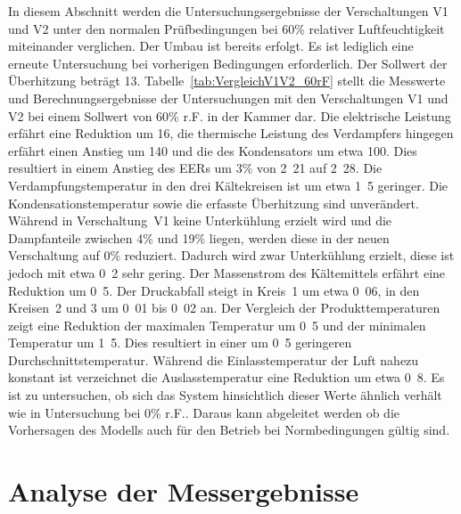 In diesem Abschnitt werden die Untersuchungsergebnisse der Verschaltungen V1 und V2 unter den normalen Prüfbedingungen bei \unit{60}{\%} relativer Luftfeuchtigkeit miteinander verglichen. Der Umbau ist bereits erfolgt. Es ist lediglich eine erneute Untersuchung bei vorherigen Bedingungen erforderlich. Der Sollwert der Überhitzung beträgt \unit{13}{\kelvin}. \newline
Tabelle~\ref{tab:VergleichV1V2_60rF} stellt die Messwerte und Berechnungsergebnisse der Untersuchungen mit den Verschaltungen V1 und V2 bei einem Sollwert von \unit{60}{\%} r.F. in der Kammer dar. Die elektrische Leistung erfährt eine Reduktion um \unit{16}{\watt}, die thermische Leistung des Verdampfers hingegen erfährt einen Anstieg um \unit{140}{\watt} und die des Kondensators um etwa \unit{100}{\watt}. Dies resultiert in einem Anstieg des EERs um \unit{3}{\%} von \unit{2.21}{} auf \unit{2.28}{}.
Die Verdampfungstemperatur in den drei Kältekreisen ist um etwa \unit{1.5}{\kelvin} geringer. Die Kondensationstemperatur sowie die erfasste Überhitzung sind unverändert.
Während in Verschaltung~V1 keine Unterkühlung erzielt wird und die Dampfanteile zwischen \unit{4}{\%} und \unit{19}{\%} liegen, werden diese in der neuen Verschaltung auf \unit{0}{\%} reduziert. Dadurch wird zwar Unterkühlung erzielt, diese ist jedoch mit etwa \unit{0.2}{\kelvin} sehr gering. Der Massenstrom des Kältemittels erfährt eine Reduktion um \unit{0.5}{\gram\per\second}. Der Druckabfall steigt in Kreis~1 um etwa \unit{0.06}{\bbar}, in den Kreisen~2 und 3 um \unit{0.01}{\bbar} bis \unit{0.02}{\bbar} an. Der Vergleich der Produkttemperaturen zeigt eine Reduktion der maximalen Temperatur um \unit{0.5}{\kelvin} und der minimalen Temperatur um \unit{1.5}{\kelvin}. Dies resultiert in einer um \unit{0.5}{\kelvin} geringeren Durchschnittstemperatur.
Während die Einlasstemperatur der Luft nahezu konstant ist verzeichnet die Auslasstemperatur eine Reduktion um etwa \unit{0.8}{\kelvin}.
Es ist zu untersuchen, ob sich das System hinsichtlich dieser Werte ähnlich verhält wie in Untersuchung bei \unit{0}{\%} r.F.. Daraus kann abgeleitet werden ob die Vorhersagen des Modells auch für den Betrieb bei Normbedingungen gültig sind.






\chapter{Analyse der Messergebnisse}
\label{cha:Analyse der Messergebnisse}

